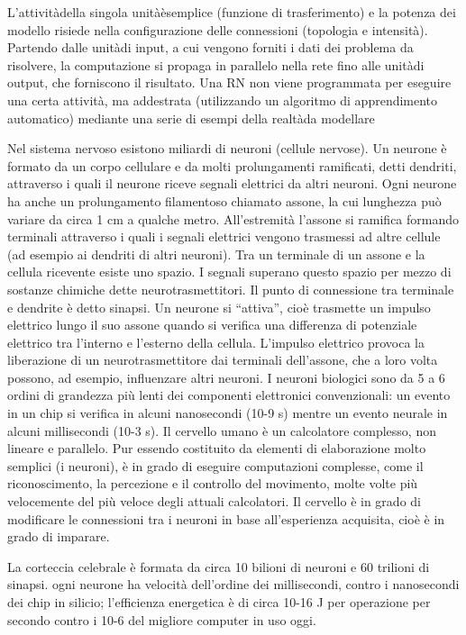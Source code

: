 \documentclass[12pt,a4paper,oneside]{book}
\begin{document}
		L'attivitàdella singola unitàèsemplice (funzione di trasferimento) e la potenza dei modello risiede nella configurazione delle connessioni (topologia e intensità).
		Partendo dalle unitàdi input, a cui vengono forniti i dati dei problema da risolvere, la computazione si propaga in parallelo nella rete fino alle unitàdi output, che forniscono il risultato.
		Una RN non viene programmata per eseguire una certa attività, ma addestrata (utilizzando un algoritmo di apprendimento automatico) mediante una serie di esempi della realtàda modellare
		
		
		
	Nel sistema nervoso esistono miliardi di neuroni (cellule nervose). Un neurone è formato da un corpo cellulare e da molti prolungamenti ramificati, detti dendriti, attraverso i quali il neurone riceve segnali elettrici da altri neuroni. Ogni neurone ha anche un prolungamento filamentoso chiamato assone, la cui lunghezza può variare da circa 1 cm a qualche metro. All’estremità l’assone si ramifica formando terminali attraverso i quali i segnali elettrici vengono trasmessi ad altre cellule (ad esempio ai dendriti di altri neuroni). Tra un terminale di un assone e la cellula ricevente esiste uno spazio. I segnali superano questo spazio per mezzo di sostanze chimiche dette neurotrasmettitori. Il punto di connessione tra terminale e dendrite è detto sinapsi. Un neurone si “attiva”, cioè trasmette un impulso elettrico lungo il suo assone quando si verifica una differenza di potenziale elettrico tra l’interno e l’esterno della cellula. L’impulso elettrico provoca la liberazione di un neurotrasmettitore dai terminali dell’assone, che a loro volta possono, ad esempio, influenzare altri neuroni. I neuroni biologici sono da 5 a 6 ordini di grandezza più lenti dei componenti elettronici convenzionali: un evento in un chip si verifica in alcuni nanosecondi (10-9 s) mentre un evento neurale in alcuni millisecondi (10-3 s). Il cervello umano è un calcolatore complesso, non lineare e parallelo. Pur essendo costituito da elementi di elaborazione molto semplici (i neuroni), è in grado di eseguire computazioni complesse, come il riconoscimento, la percezione e il controllo del movimento, molte volte più velocemente del più veloce degli attuali calcolatori. Il cervello è in grado di modificare le connessioni tra i neuroni in base all’esperienza acquisita, cioè è in grado di imparare. 
		
		
	 
		La corteccia celebrale è formata da circa 10 bilioni di neuroni e 60 trilioni di sinapsi. 
		ogni neurone ha velocità dell'ordine dei millisecondi, contro i nanosecondi dei chip in silicio; 
		l'efficienza energetica è di circa 10-16 J per operazione per secondo contro i 10-6 del migliore
		computer in uso oggi. 
		
\end{document}
